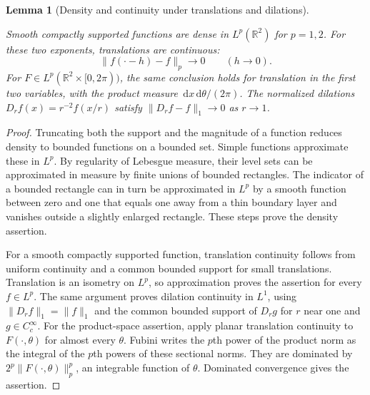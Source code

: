 \documentclass[11pt]{amsart}
\newcommand{\R}{\mathbb R}
\newcommand{\dd}{\,\mathrm d}
\newtheorem{lemma}[theorem]{Lemma}
\theoremstyle{definition}
\theoremstyle{remark}
\numberwithin{equation}{section}
\providecommand{\lean}[1]{}
\providecommand{\leanok}{}
\begin{document}
\begin{lemma}[Density and continuity under translations and dilations]
\label{ext:approximation}
\lean{Auto.ext_approximation_dense,Auto.ext_approximation_translation,Auto.ext_approximation_translation_config,Auto.ext_approximation_dilation}
\leanok
Smooth compactly supported functions are dense in $L^p(\R^2)$ for
$p=1,2$.  For these two exponents, translations are continuous:
\[
 \|f(\cdot-h)-f\|_p\longrightarrow0\qquad(h\to0).
\]
For $F\in L^p(\R^2\times[0,2\pi))$, the same conclusion
holds for translation in the first two variables, with the
product measure $\dd x\dd\theta/(2\pi)$.
The normalized dilations $D_rf(x)=r^{-2}f(x/r)$ satisfy
$\|D_rf-f\|_1\to0$ as $r\to1$.
\end{lemma}
\begin{proof}
Truncating both the support and the magnitude of a function reduces
density to bounded functions on a bounded set.  Simple functions
approximate these in $L^p$.  By regularity of Lebesgue measure, their
level sets can be approximated in measure by finite unions of bounded
rectangles.  The indicator of a bounded rectangle can in turn be
approximated in $L^p$ by a smooth function between zero and one that
equals one away from a thin boundary layer and vanishes outside a
slightly enlarged rectangle.  These steps prove the density assertion.

For a smooth compactly supported function, translation continuity
follows from uniform continuity and a common bounded support for small
translations.  Translation is an isometry on $L^p$, so approximation
proves the assertion for every $f\in L^p$.  The same argument proves
dilation continuity in $L^1$, using $\|D_rf\|_1=\|f\|_1$ and the
common bounded support of $D_rg$ for $r$ near one and $g\in C_c^\infty$.
For the product-space assertion, apply planar translation
continuity to $F(\cdot,\theta)$ for almost every $\theta$.
Fubini writes the $p$th power of the product norm as the
integral of the $p$th powers of these sectional norms.
They are dominated by
$2^p\|F(\cdot,\theta)\|_p^p$, an integrable function of
$\theta$.  Dominated convergence gives the assertion.
\end{proof}
\end{document}
